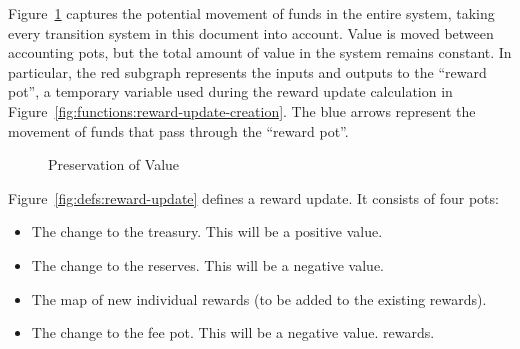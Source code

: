 Figure~\ref{fig:fund-preservation} captures the potential movement of funds in the entire system,
taking every transition system in this document into account.  Value is moved between
accounting pots, but the total amount of value in the system remains constant.
In particular, the red subgraph represents the inputs and outputs to
the ``reward pot'', a temporary variable used during the reward update calculation in
Figure~\ref{fig:functions:reward-update-creation}.
The blue arrows represent the movement of funds that pass through the ``reward pot''.


\begin{figure}[htb]
  \begin{center}
  \end{center}
  \caption{Preservation of Value}
  \label{fig:fund-preservation}
\end{figure}

Figure~\ref{fig:defs:reward-update} defines a reward update.
It consists of four pots:
\begin{itemize}
  \item The change to the treasury. This will be a positive value.
  \item The change to the reserves. This will be a negative value.
  \item The map of new individual rewards (to be added to the existing rewards).
  \item The change to the fee pot. This will be a negative value.
    rewards.
\end{itemize}

